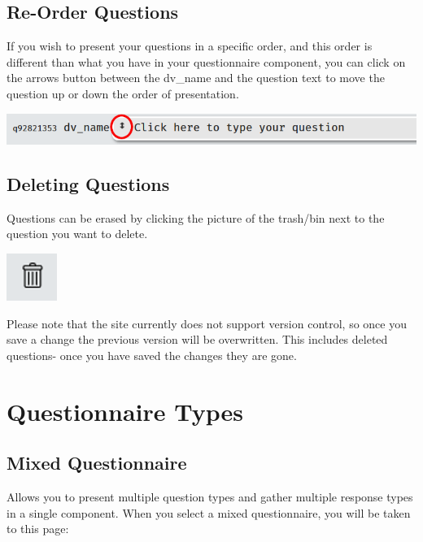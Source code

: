 \documentclass[]{book}
\begin{document}
\subsection{Re-Order Questions}\label{re-order-questions}

If you wish to present your questions in a specific order, and this
order is different than what you have in your questionnaire component,
you can click on the arrows button between the dv\_name and the question
text to move the question up or down the order of presentation.

\includegraphics{images/screenshots/qreorder.png}

\subsection{Deleting Questions}\label{deleting-questions}

Questions can be erased by clicking the picture of the trash/bin next to
the question you want to delete.

\includegraphics{images/screenshots/bin.png}

\begin{danger}
Please note that the site currently does not support version control, so
once you save a change the previous version will be overwritten. This
includes deleted questions- once you have saved the changes they are
gone.
\end{danger}

\section{Questionnaire Types}\label{questionnaire-types}

\subsection{Mixed Questionnaire}\label{mixed-questionnaire}

Allows you to present multiple question types and gather multiple
response types in a single component. When you select a mixed
questionnaire, you will be taken to this page:
\end{document}

